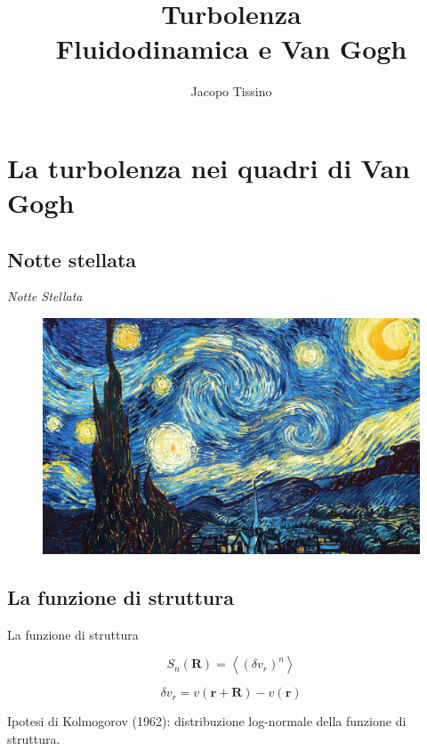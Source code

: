 \documentclass[11pt]{beamer}
\author{Jacopo Tissino}
\title{Turbolenza\\
Fluidodinamica e Van Gogh}
\institute{Liceo Scientifico ``M. Grigoletti''}
\begin{document}
\begin{frame}
\titlepage
\end{frame}

\begin{frame}
\tableofcontents
\end{frame}

\section{La turbolenza nei quadri di Van Gogh}

\subsection{Notte stellata}

\begin{frame}{\emph{Notte Stellata}}
\begin{figure}
\centering
\includegraphics[scale=0.11]{the-starry-night-1889.jpg}
\end{figure}
\end{frame}

\subsection{La funzione di struttura}

\begin{frame}{La funzione di struttura}

\begin{equation}
S_n (\mathbf{R} ) =
\left\langle 
\left(
\delta v_r 
\right)^n
\right\rangle
\end{equation}

\begin{equation}
\delta v_r = v(\mathbf{r} + \mathbf{R}) - v(\mathbf{r})
\end{equation}

Ipotesi di Kolmogorov (1962): distribuzione log-normale della funzione di struttura.
\end{frame}
\end{document}
